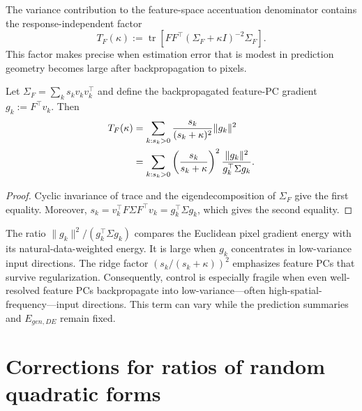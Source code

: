 The variance contribution to the feature-space accentuation denominator
contains the response-independent factor
\begin{equation}
  T_F(\kappa)
  :=\operatorname{tr}\!\left[
  FF^\top(\Sigma_F+\kappa I)^{-2}\Sigma_F\right].
  \label{eq:feature-fragility-trace}
\end{equation}
This factor makes precise when estimation error that is modest in prediction
geometry becomes large after backpropagation to pixels.

\begin{proposition}
\label{prop:feature-fragility-spectrum}
Let $\Sigma_F=\sum_k s_k v_kv_k^\top$ and define the backpropagated
feature-PC gradient $g_k:=F^\top v_k$.  Then
\begin{align}
  T_F(\kappa)
  &=\sum_{k:s_k>0}\frac{s_k}{(s_k+\kappa)^2}\|g_k\|^2 \notag\\
  &=\sum_{k:s_k>0}\left(\frac{s_k}{s_k+\kappa}\right)^2
    \frac{\|g_k\|^2}{g_k^\top\Sigma g_k}.
  \label{eq:feature-fragility-spectrum}
\end{align}
\end{proposition}
\begin{proof}
Cyclic invariance of trace and the eigendecomposition of $\Sigma_F$ give
the first equality.  Moreover,
$s_k=v_k^\top F\Sigma F^\top v_k=g_k^\top\Sigma g_k$, which gives the
second equality.
\end{proof}

\begin{remark}
The ratio $\|g_k\|^2/(g_k^\top\Sigma g_k)$ compares the Euclidean pixel
gradient energy with its natural-data-weighted energy.  It is large when
$g_k$ concentrates in low-variance input directions.  The ridge factor
$(s_k/(s_k+\kappa))^2$ emphasizes feature PCs that survive regularization.
Consequently, control is especially fragile when even well-resolved feature
PCs backpropagate into low-variance---often high-spatial-frequency---input
directions.  This term can vary while the prediction summaries and
$E_{gen,DE}$ remain fixed.
\end{remark}



\section{Corrections for ratios of random quadratic forms}
\label{sec:app-ratio-approximations}
\label{sec:app-ratio-corrections}

